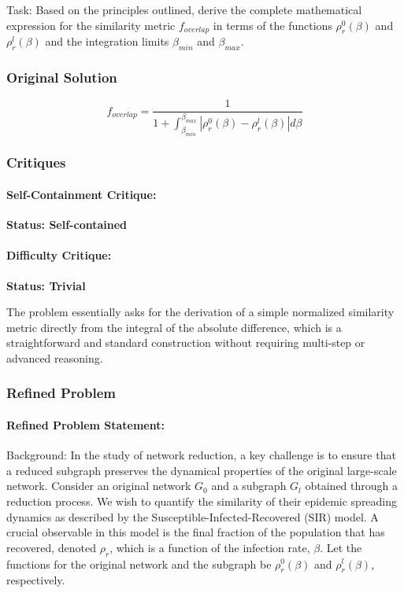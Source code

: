 \documentclass[10pt]{article}
\begin{document}
Task:
Based on the principles outlined, derive the complete mathematical expression for the similarity metric $f_{overlap}$ in terms of the functions $\rho_r^0(\beta)$ and $\rho_r^l(\beta)$ and the integration limits $\beta_{min}$ and $\beta_{max}$.

\subsubsection*{Original Solution}
\[ f_{overlap} = \frac{1}{1 + \int_{\beta_{min}}^{\beta_{max}} |\rho_r^0(\beta) - \rho_r^l(\beta)| d\beta} \]

\subsubsection*{Critiques}
\paragraph*{Self-Containment Critique:}
\textcolor{pass}{\textbf{Status: Self-contained}}




\paragraph*{Difficulty Critique:}
\textcolor{fail}{\textbf{Status: Trivial}}

The problem essentially asks for the derivation of a simple normalized similarity metric directly from the integral of the absolute difference, which is a straightforward and standard construction without requiring multi-step or advanced reasoning.


\subsubsection*{Refined Problem}
\paragraph*{Refined Problem Statement:}
Background: In the study of network reduction, a key challenge is to ensure that a reduced subgraph preserves the dynamical properties of the original large-scale network. Consider an original network $G_0$ and a subgraph $G_l$ obtained through a reduction process. We wish to quantify the similarity of their epidemic spreading dynamics as described by the Susceptible-Infected-Recovered (SIR) model. A crucial observable in this model is the final fraction of the population that has recovered, denoted $\rho_r$, which is a function of the infection rate, $\beta$. Let the functions for the original network and the subgraph be $\rho_r^0(\beta)$ and $\rho_r^l(\beta)$, respectively.
\end{document}
